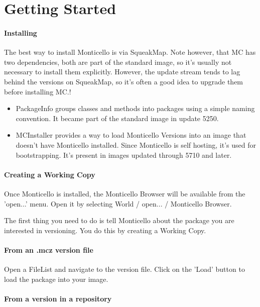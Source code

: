 \section{Getting Started}

\paragraph{Installing}

The best way to install Monticello is via SqueakMap. Note however, that MC has two dependencies, both are part of the standard image, so it's usually not necessary to install them explicitly. However, the update stream tends to lag behind the versions on SqueakMap, so it's often a good idea to upgrade them before installing MC.!
\begin{itemize}
\item PackageInfo groups classes and methods into packages using a simple naming convention. It became part of the standard image in update 5250.
\item MCInstaller provides a way to load Monticello Versions into an image that doesn't have Monticello installed. Since Monticello is self hosting, it's used for bootstrapping. It's present in images updated through 5710 and later.
\end{itemize}

\paragraph{Creating a Working Copy}

Once Monticello is installed, the Monticello Browser will be available from the 'open...' menu. Open it by selecting World / open... / Monticello Browser.

The first thing you need to do is tell Monticello about the package you are interested in versioning. You do this by creating a Working Copy.

\paragraph{From an .mcz version file}
Open a FileList and navigate to the version file. Click on the 'Load' button to load the package into your image.

\paragraph{From a version in a repository}

